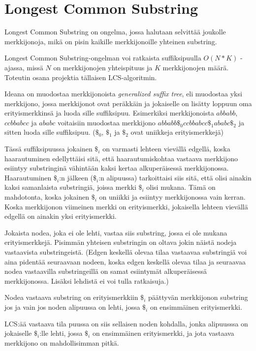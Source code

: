 \documentclass{article}
\begin{document}
  \newpage
  \section{Longest Common Substring}
    Longest Common Substring on ongelma, jossa halutaan selvittää joukolle merkkijonoja, mikä on pisin kaikille merkkijonoille
    yhteinen substring.
    
    Longest Common Substring-ongelman voi ratkaista suffiksipuulla $O(N*K)$ -ajassa, missä $N$ on merkkijonojen yhteispituus ja
    $K$ merkkijonojen määrä. Toteutin osana projektia tällaisen LCS-algoritmin.
    
    Ideana on muodostaa merkkijonoista \textit{generalized suffix tree}, eli muodostaa yksi merkkijono, jossa merkkijonot ovat
    peräkkäin ja jokaiselle on lisätty loppuun oma erityismerkkinsä ja luoda sille suffiksipuu.
    Esimerkiksi merkkijonoista $abbabb$, $ccbbabcc$ ja $ababc$ voitaisiin muodostaa merkkijono $abbabb\$_0ccbbabcc\$_1ababc\$_2$
    ja sitten luoda sille suffiksipuu. ($\$_0$, $\$_1$ ja $\$_2$ ovat uniikkeja erityismerkkejä)
    
    Tässä suffiksipuussa jokainen $\$_i$ on varmasti lehteen vievällä edgellä, koska haarautuminen edellyttäisi sitä, että
    haarautumiskohtaa vastaava merkkijono esiintyy substringinä vähintään kaksi kertaa alkuperäisessä merkkijonossa. Haarautuminen
    $\$_i$:n jälkeen ($\$_i$:n alipuussa) tarkoittaisi siis sitä, että olisi ainakin kaksi samanlaista substringiä, joissa merkki 
    $\$_i$ olisi mukana. Tämä on mahdotonta, koska jokainen $\$_i$ on uniikki ja esiintyy merkkijonossa vain kerran. Koska 
    merkkijonon viimeinen merkki on erityismerkki, jokaisella lehteen vievällä edgellä on ainakin yksi erityismerkki.
    
    Jokaista nodea, joka ei ole lehti, vastaa siis substring, jossa ei ole mukana erityismerkkejä. Pisimmän yhteisen substringin
    on oltava jokin näistä nodeja vastaavista substringeistä. (Edgen keskellä olevaa tilaa vastaavaa substringiä voi aina pidentää 
    seuraavaan nodeen, koska edgen keskellä olevaa tilaa ja seuraavaa nodea vastaavilla substringeillä on samat esiintymät 
    alkuperäisessä merkkijonossa. Lisäksi lehdistä ei voi tulla ratkaisuja.)
    
    Nodea vastaava substring on erityismerkkiin $\$_i$ päättyvän merkkijonon substring jos ja vain jos noden alipuussa on lehti, jossa
    $\$_i$ on ensimmäinen erityismerkki.
    
    LCS:ää vastaava tila puussa on siis sellaisen noden kohdalla, jonka alipuusssa on jokaiselle $\$_i$:lle lehti, jossa $\$_i$ 
    on ensimmäinen erityismerkki, ja jota vastaava merkkijono on mahdollisimman pitkä.
    
\end{document}
